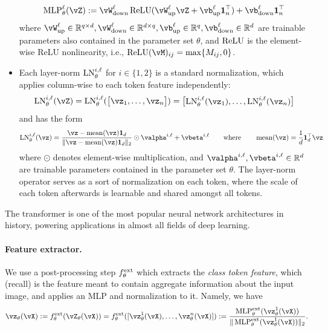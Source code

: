 \documentclass[\toplevelprefix/book-main.tex]{subfiles}
\begin{document}
\begin{itemize}
    \begin{equation}
        \MLP_{\theta}^{\ell}(\vZ) := \vW_{\down}^{\ell}\ReLU(\vW_{\up}^{\ell}\vZ + \vb_{\up}^{\ell}\vone_{n}^{\top}) + \vb_{\down}^{\ell}\vone_{n}^{\top}
    \end{equation}
    where \(\vW_{\up}^{\ell} \in \R^{q \times d}, \vW_{\down}^{\ell} \in \R^{d \times q}, \vb_{\up}^{\ell} \in \R^{q}, \vb_{\down}^{\ell} \in \R^{d}\) are trainable parameters also contained in the parameter set \(\theta\), and \(\operatorname{ReLU}\) is the element-wise ReLU nonlinearity, i.e., \(\ReLU(\vM)_{ij} = \max\{M_{ij}, 0\}\). 
    \item Each layer-norm \(\operatorname{LN}_{\theta}^{i, \ell}\) for \(i \in \{1, 2\}\) is a standard normalization, which applies column-wise to each token feature independently:
    \begin{equation}
        \LN_{\theta}^{i, \ell}(\vZ) = \LN_{\theta}^{i, \ell}(\mat{\vz_{1}, \dots, \vz_{n}}) = \mat{\LN_{\theta}^{i, \ell}(\vz_{1}), \dots, \LN_{\theta}^{i, \ell}(\vz_{n})}
    \end{equation}
    and has the form 
    \begin{equation}
        \LN_{\theta}^{i, \ell}(\vz) = \frac{\vz - \operatorname{mean}(\vz)\vone_{d}}{\norm{\vz - \operatorname{mean}(\vz)\vone_{d}}_{2}} \odot \valpha^{i, \ell} + \vbeta^{i, \ell} \qquad \text{where} \qquad \operatorname{mean}(\vz) = \frac{1}{d}\vone_{d}^{\top}\vz
    \end{equation}
    where \(\odot\) denotes element-wise multiplication, and \(\valpha^{i, \ell}, \vbeta^{i, \ell} \in \R^{d}\) are trainable parameters contained in the parameter set \(\theta\). The layer-norm operator serves as a sort of normalization on each token, where the scale of each token afterwards is learnable and shared amongst all tokens. 
\end{itemize}

The transformer is one of the most popular neural network architectures in history, powering applications in almost all fields of deep learning. 

\paragraph{Feature extractor.} We use a post-processing step \(f_{\theta}^{\mathrm{ext}}\) which extracts the \textit{class token feature}, which (recall) is the feature meant to contain aggregate information about the input image, and applies an MLP and normalization to it. Namely, we have 
\begin{equation}
    \vz_{\theta}(\vX) := f_{\theta}^{\ext}(\vZ_{\theta}(\vX)) = f_{\theta}^{\ext}([\vz_{\theta}^{1}(\vX), \dots, \vz_{\theta}^{n}(\vX)]) := \frac{\MLP_{\theta}^{\ext}(\vz_{\theta}^{1}(\vX))}{\norm{\MLP_{\theta}^{\ext}(\vz_{\theta}^{1}(\vX))}_{2}}.
\end{equation} 
\end{document}
